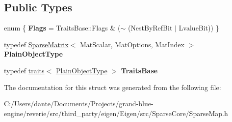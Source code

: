 \subsection*{Public Types}
\begin{DoxyCompactItemize}
\item 
\mbox{\label{struct_eigen_1_1internal_1_1traits_3_01_map_3_01const_01_sparse_matrix_3_01_mat_scalar_00_01_matec7066c11e5361dce6e4102c84e4bcd2_aebfeb2f0ba8570ea8baf817d8acc8116}} 
enum \{ {\bfseries Flags} = Traits\+Base\+::Flags \& ($\sim$ (Nest\+By\+Ref\+Bit $\vert$ Lvalue\+Bit))
 \}
\item 
\mbox{\label{struct_eigen_1_1internal_1_1traits_3_01_map_3_01const_01_sparse_matrix_3_01_mat_scalar_00_01_matec7066c11e5361dce6e4102c84e4bcd2_aa0d840829b31013d85c936aeefad90bb}} 
typedef \mbox{\hyperlink{class_eigen_1_1_sparse_matrix}{Sparse\+Matrix}}$<$ Mat\+Scalar, Mat\+Options, Mat\+Index $>$ {\bfseries Plain\+Object\+Type}
\item 
\mbox{\label{struct_eigen_1_1internal_1_1traits_3_01_map_3_01const_01_sparse_matrix_3_01_mat_scalar_00_01_matec7066c11e5361dce6e4102c84e4bcd2_a12f305d44fd9b97871284d93cec976ca}} 
typedef \mbox{\hyperlink{struct_eigen_1_1internal_1_1traits}{traits}}$<$ \mbox{\hyperlink{class_eigen_1_1_sparse_matrix}{Plain\+Object\+Type}} $>$ {\bfseries Traits\+Base}
\end{DoxyCompactItemize}


The documentation for this struct was generated from the following file\+:\begin{DoxyCompactItemize}
\item 
C\+:/\+Users/dante/\+Documents/\+Projects/grand-\/blue-\/engine/reverie/src/third\+\_\+party/eigen/\+Eigen/src/\+Sparse\+Core/Sparse\+Map.\+h\end{DoxyCompactItemize}
